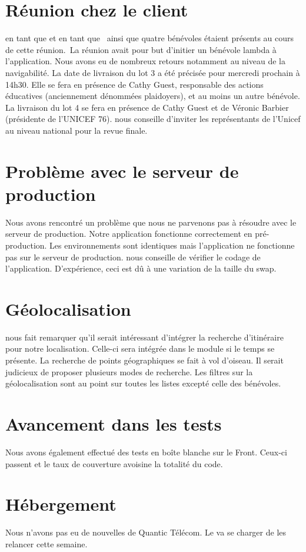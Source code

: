 \documentclass [a4paper] {article}
\begin{document}
\section{Réunion chez le client}
\Pierre{} en tant que \CP{} et \Julie{} en tant que \RD{} ainsi que quatre bénévoles étaient présents au cours de cette réunion. La réunion avait pour but d'initier un bénévole lambda à l'application.  Nous avons eu de nombreux retours notamment au niveau de la navigabilité. La date de livraison du lot 3 a été précisée pour mercredi prochain à 14h30. Elle se fera en présence de Cathy Guest, responsable des actions éducatives (anciennement dénommées plaidoyers), et au moins un autre bénévole. La livraison du lot 4 se fera en présence de Cathy Guest et de Véronic Barbier (présidente de l'UNICEF 76).
\nomTuteurPedago{} nous conseille d'inviter les représentants de l'Unicef au niveau national  pour la revue finale.\\


\section{Problème avec le serveur de production}
Nous avons rencontré un problème que nous ne parvenons pas à résoudre avec le serveur de production. Notre application fonctionne correctement en pré-production. Les environnements sont identiques mais l'application ne fonctionne pas sur le serveur de production. \nomTuteurPedago{} nous conseille de vérifier le codage de l'application. D'expérience, ceci est dû à une variation de la taille du swap.
\\

\section{Géolocalisation}
\nomTuteurPedago{} nous fait remarquer qu'il serait intéressant d'intégrer la recherche d'itinéraire pour notre localisation. Celle-ci sera intégrée dans le module si le temps se présente. La recherche de points géographiques se fait à vol d'oiseau. Il serait judicieux de proposer plusieurs modes de recherche. Les filtres sur la géolocalisation sont au point sur toutes les listes excepté celle des bénévoles.\\

\section{Avancement dans les tests}
Nous avons également effectué des tests en boîte blanche sur le Front. Ceux-ci passent et le taux de couverture avoisine la totalité du code.\\

\section{Hébergement}
Nous n'avons pas eu de nouvelles de Quantic Télécom. Le \CP{} va se charger de les relancer cette semaine.
\newpage
\end{document}

